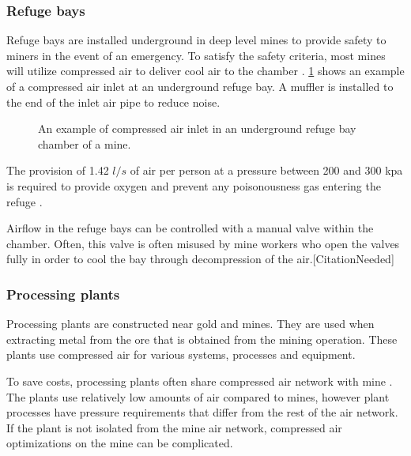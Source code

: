 \subsubsection{Refuge bays}
Refuge bays are installed underground in deep level mines to provide safety to miners in the event of an emergency. To satisfy the safety criteria, most mines will utilize compressed air to deliver cool air to the chamber \cite{brake1999criteria}. \cref{fig: Refuge Bay} shows an example of a compressed air inlet at an underground refuge bay. A muffler is installed to the end of the inlet air pipe to reduce noise.
\begin{figure}[h]
	\centering
	\caption{An example of compressed air inlet in an underground refuge bay chamber of a mine.}
	\label{fig: Refuge Bay}
\end{figure}
\par The provision of 1.42 $l/s$ of air per person at a pressure between 200 and 300 \gls{kpa} is required to provide oxygen and prevent any poisonousness gas entering the refuge \cite{brake1999criteria}.\par
Airflow in the refuge bays can be controlled with a manual valve within the chamber. Often, this valve is often misused by mine workers who open the valves fully in order to cool the bay through decompression of the air.[CitationNeeded]
\subsubsection{Processing plants}
Processing plants are constructed near gold and mines. They are used when extracting metal from the ore that is obtained from the mining operation. These plants use compressed air for various systems, processes and equipment. 
\par 
To save costs, processing plants often share compressed air network with mine \cite{Marais2012PhD}. The plants use relatively low amounts of air compared to mines, however plant processes have pressure requirements that differ from the rest of the air network. If the plant is not isolated from the mine air network, compressed air optimizations on the mine can be complicated. 
